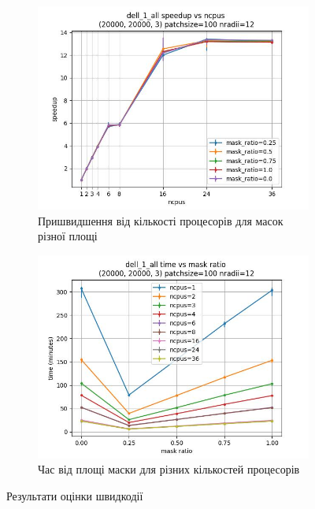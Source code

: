 \begin{figure}[h]
    \begin{subfigure}{0.45\textwidth}
    \includegraphics[width=0.99\linewidth]{img/fastlbp/speedup_ncpus.jpg}
    \caption{
        Пришвидшення від кількості процесорів для масок різної площі
    }
    \label{subfig:parallell-efficiency-b}
    \end{subfigure}%
    \begin{subfigure}{0.45\textwidth}
    \includegraphics[width=0.99\linewidth]{img/fastlbp/time_mr.jpg}
    \caption{
        Час від площі маски для різних кількостей процесорів
    }
    \label{subfig:parallell-efficiency-с}
    \end{subfigure}
    
    \caption{Результати оцінки швидкодії}
    \label{fig:parallell-efficiency}
\end{figure}
